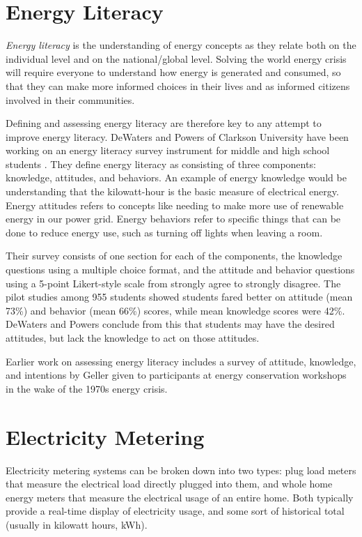 \section{Energy Literacy}
\label{sec:energy-literacy}

\emph{Energy literacy} is the understanding of energy concepts as they relate both on the individual level and on the national/global level. Solving the world energy crisis will require everyone to understand how energy is generated and consumed, so that they can make more informed choices in their lives and as informed citizens involved in their communities.

Defining and assessing energy literacy are therefore key to any attempt to improve energy literacy. DeWaters and Powers of Clarkson University have been working on an energy literacy survey instrument for middle and high school students \cite{DeWaters09c, DeWaters09}. They define energy literacy as consisting of three components: knowledge, attitudes, and behaviors. An example of energy knowledge would be understanding that the kilowatt-hour is the basic measure of electrical energy. Energy attitudes refers to concepts like needing to make more use of renewable energy in our power grid. Energy behaviors refer to specific things that can be done to reduce energy use, such as turning off lights when leaving a room.

Their survey consists of one section for each of the components, the knowledge questions using a multiple choice format, and the attitude and behavior questions using a 5-point Likert-style scale from strongly agree to strongly disagree. The pilot studies among 955 students showed students fared better on attitude (mean 73\%) and behavior (mean 66\%) scores, while mean knowledge scores were 42\%. DeWaters and Powers conclude from this that students may have the desired attitudes, but lack the knowledge to act on those attitudes.

Earlier work on assessing energy literacy includes a survey of attitude, knowledge, and intentions by Geller \cite{Geller81} given to participants at energy conservation workshops in the wake of the 1970s energy crisis.


\section{Electricity Metering}

Electricity metering systems can be broken down into two types: plug load meters that measure the electrical load directly plugged into them, and whole home energy meters that measure the electrical usage of an entire home. Both typically provide a real-time display of electricity usage, and some sort of historical total (usually in kilowatt hours, kWh).

